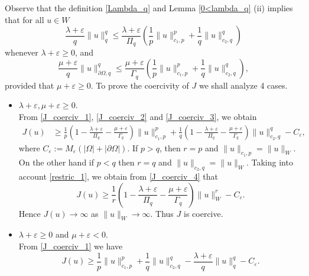 \documentclass[pdflatex,sn-mathphys-num]{sn-jnl}
\theoremstyle{thmstyleone}%
\theoremstyle{thmstyletwo}%
\theoremstyle{thmstylethree}%
\theoremstyle{thmstylethree}%
\begin{document}
    
Observe that
 the definition \ref{Lambda_q} and Lemma \ref{0<lambda_q} (ii) implies that
  for all $u\in W$
\begin{equation}\label{J_coerciv_2}
   \frac{\lambda+\varepsilon}{q} \|u\|_q^q\leqslant \frac{\lambda+\varepsilon}{{\Pi}_q}\left(\frac{1}{p}\|u\|_{c_1,p}^p+\frac{1}{q}\|u\|_{c_2,q}^q\right)
 \end{equation}
whenever $\lambda+\varepsilon\geqslant 0$, and
\begin{equation}\label{J_coerciv_3}
     \frac{\mu+\varepsilon}{q} \|u\|_{\partial \Omega,q}^q \leqslant \frac{\mu+\varepsilon}{{\Gamma}_q}\left(\frac{1}{p}\|u\|_{c_1,p}^p+\frac{1}{q}\|u\|_{c_2,q}^q\right) ,
\end{equation}
 provided that $\mu+\varepsilon \geqslant 0$.
    To prove the coercivity of $J$ we shall analyze 4 cases. 
    \begin{itemize}
        \item[Case 1:] $\lambda+\varepsilon, \mu+\varepsilon \geqslant 0$.\\
From \eqref{J_coerciv_1}, \eqref{J_coerciv_2} and \eqref{J_coerciv_3}, we obtain
\begin{align}\label{J_coerciv_4}
    J(u) &\geqslant 
    \frac{1}{p}\left( 1- \frac{\lambda+\varepsilon}{ {\Pi}_q}-\frac{\mu+\varepsilon}{ {\Gamma}_q} \right)\|u\|_{c_1,p}^p+\frac{1}{q}\left( 1- \frac{\lambda+\varepsilon}{ {\Pi}_q}-\frac{\mu+\varepsilon}{ {\Gamma}_q} \right)\|u\|_{c_2,q}^q-C_\varepsilon,
\end{align}
where $C_\varepsilon:=M_\varepsilon (|\Omega|+|\partial\Omega|)$. If $p > q$, then $r=p$ and $\|u\|_{c_1,p}=\|u\|_{W}$. On the other hand if $p<q$ then $r=q$ and $\|u\|_{c_2,q}=\|u\|_{W}$. 
Taking into account \eqref{restric_1}, we obtain from \eqref{J_coerciv_4} that \begin{equation*}\label{J_coerciv_5}
     J(u) \geqslant \frac{1}{r}\left( 1- \frac{\lambda+\varepsilon}{ {\Pi}_q}-\frac{\mu+\varepsilon}{ {\Gamma}_q} \right)\|u\|_{W}^r-C_\varepsilon.
 \end{equation*}
 Hence $J(u) \to \infty$ as $\|u\|_{W}\to \infty$. Thus $J$ is coercive.  
\item[Case 2:] $\lambda+\varepsilon \geqslant 0$ and $\mu+\varepsilon<0$.\\ 
From \eqref{J_coerciv_1} we have
 \begin{equation*}
     J(u) \geqslant \frac{1}{p}\|u\|_{c_1,p}^p+\frac{1}{q}\|u\|_{c_2,q}^q - \frac{\lambda+\varepsilon}{q} \|u\|_q^q -C_\varepsilon.
 \end{equation*}

\end{itemize}
\end{document}
